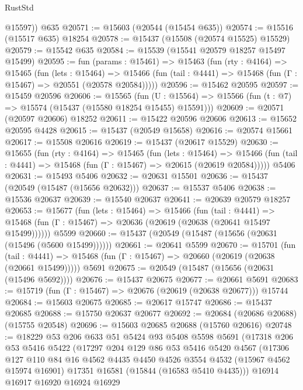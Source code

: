\begin{lexlean}{RustStd}
\begin{coremodule}
        @15597))
    @635
@20571 := @15603 (@20544 (@15454 @635))
@20574 := @15516 (@15517 @635) @18254
@20578 := @15437 (@15508 (@20574 @15525) @15529)
@20579 := @15542 @635
@20584 := @15539 (@15541 @20579 @18257 @15497 @15499)
@20595 := fun (params : @15461) =>
  @15463
    (fun (rty : @4164) =>
    @15465
      (fun (lets : @15464) =>
      @15466 (fun (tail : @4441) => @15468 (fun (Γ : @15467) => @20551 (@20578 @20584)))))
@20596 := @15462 @20595
@20597 := @15459 @20596
@20606 := @15565
    (fun (U : @15564) => @15566 (fun (t : @7) => @15574 (@15437 (@15580 @18254 @15455) @15591)))
@20609 := @20571 (@20597 @20606) @18252
@20611 := @15422 @20596 @20606
@20613 := @15652 @20595 @4428
@20615 := @15437 (@20549 @15658)
@20616 := @20574 @15661
@20617 := @15508 @20616
@20619 := @15437 (@20617 @15529)
@20630 := @15655
    (fun (rty : @4164) =>
    @15465
      (fun (lets : @15464) =>
      @15466 (fun (tail : @4441) => @15468 (fun (Γ : @15467) => @20615 (@20619 @20584)))))
    @5406
@20631 := @15493 @5406
@20632 := @20631 @15501
@20636 := @15437 (@20549 (@15487 (@15656 @20632)))
@20637 := @15537 @5406
@20638 := @15536 @20637
@20639 := @15540 @20637
@20641 := @20639 @20579 @18257
@20653 := @15677
    (fun (lets : @15464) =>
    @15466
      (fun (tail : @4441) =>
      @15468 (fun (Γ : @15467) => @20636 (@20619 (@20638 (@20641 @15497 @15499))))))
    @5599
@20660 := @15437 (@20549 (@15487 (@15656 (@20631 (@15496 (@5600 @15499))))))
@20661 := @20641 @5599
@20670 := @15701
    (fun (tail : @4441) => @15468 (fun (Γ : @15467) => @20660 (@20619 (@20638 (@20661 @15499)))))
    @5691
@20675 := @20549 (@15487 (@15656 (@20631 (@15496 @5692))))
@20676 := @15437 @20675
@20677 := @20661 @5691
@20683 := @15719 (fun (Γ : @15467) => @20676 (@20619 (@20638 @20677))) @15744
@20684 := @15603 @20675
@20685 := @20617 @15747
@20686 := @15437 @20685
@20688 := @15750 @20637 @20677
@20692 := @20684 (@20686 @20688) (@15755 @20548)
@20696 := @15603 @20685 @20688 (@15760 @20616)
@20748 := @18229
    @53
    @206
    @633
    @51
    @5424
    @93
    @5408
    @5598
    @5691
    (@17318
      @206
      @53
      @5416
      @5422
      (@17297
        @204
        @129
        @86
        @53
        @5416
        @5420
        @4567
        (@17306
          @127
          @110
          @84
          @16
          @4562
          @4435
          @4450
          @4526
          @3554
          @4532
          (@15967 @4562 @15974 @16901)
          @17351
          @16581
          (@15844 (@16583 @5410 @4435)))
        @16914
        @16917
        @16920
        @16924
        @16929

\end{coremodule}
\end{lexlean}
